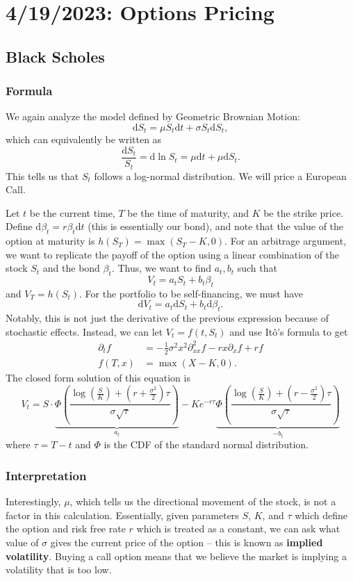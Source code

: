 \chapter{4/19/2023: Options Pricing}
\section{Black Scholes}
\subsection{Formula}
We again analyze the model defined by Geometric Brownian Motion: $$ \mathrm dS_t = \mu S_t \mathrm dt + \sigma S_t \mathrm dS_t, $$ which can equivalently be written as $$ \frac{\mathrm dS_t}{S_t} = \mathrm d\ln S_t = \mu\mathrm dt + \mu\mathrm d S_t. $$ This tells us that $S_t$ follows a log-normal distribution. We will price a European Call.

Let $t$ be the current time, $T$ be the time of maturity, and $K$ be the strike price. Define $ \mathrm d\beta_t = r \beta_t\mathrm dt $ (this is essentially our bond), and note that the value of the option at maturity is $h(S_T) = \max(S_T-K,0)$. For an arbitrage argument, we want to replicate the payoff of the option using a linear combination of the stock $S_t$ and the bond $\beta_t$. Thus, we want to find $a_t,b_t$ such that $$ V_t = a_tS_t + b_t\beta_t $$ and $V_T = h(S_t)$. For the portfolio to be self-financing, we must have $$ \mathrm dV_t = a_t\mathrm dS_t + b_t\mathrm d\beta_t. $$ Notably, this is not just the derivative of the previous expression because of stochastic effects. Instead, we can let $V_t=f(t,S_t)$ and use It\^{o}'s formula to get \begin{align*}
	\partial_t f &= -\frac{1}{2}\sigma^2 x^2\partial_{xx}^2 f - rx\partial_x f + rf \\
	f(T,x) &= \max(X-K,0).
\end{align*} The closed form solution of this equation is $$ 
V_t = S\cdot\underbrace{\Phi \left( \frac{\log \left( \frac{S}{K} \right) + \left( r + \frac{\sigma^2}{2} \right) \tau}{\sigma\sqrt{\tau}} \right)}_{a_t} - K e^{-r\tau} \underbrace{\Phi \left( \frac{\log \left( \frac{S}{K} \right) + \left( r - \frac{\sigma^2}{2} \right) \tau}{\sigma\sqrt{\tau}} \right)}_{-b_t}
$$ where $\tau=T-t$ and $\Phi$ is the CDF of the standard normal distribution.

\subsection{Interpretation}
Interestingly, $\mu$, which tells us the directional movement of the stock, is not a factor in this calculation. Essentially, given parameters $S$, $K$, and $\tau$ which define the option and risk free rate $r$ which is treated as a constant, we can ask what value of $\sigma$ gives the current price of the option -- this is known as \textbf{implied volatility}. Buying a call option means that we believe the market is implying a volatility that is too low.

